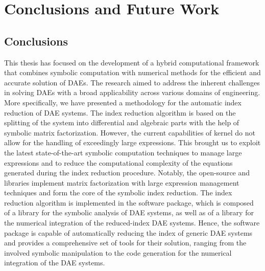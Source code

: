 
\chapter{Conclusions and Future Work}
\label{chap6:conclusions}

\section{Conclusions}

This thesis has focused on the development of a hybrid computational framework that combines symbolic computation with numerical methods for the efficient and accurate solution of \acp{DAE}. The research aimed to address the inherent challenges in solving \acp{DAE} with a broad applicability across various domains of engineering. More specifically, we have presented a methodology for the automatic index reduction of \ac{DAE} systems. The index reduction algorithm is based on the splitting of the system into differential and algebraic parts with the help of symbolic matrix factorization. However, the current capabilities of \Maple{} kernel do not allow for the handling of exceedingly large expressions. This brought us to exploit the latest state-of-the-art symbolic computation techniques to manage large expressions and to reduce the computational complexity of the equations generated during the index reduction procedure. Notably, the open-source \LEM{} and \LAST{} libraries implement matrix factorization with large expression management techniques and form the core of the symbolic index reduction. The index reduction algorithm is implemented in the \Indigo{} software package, which is composed of a \Maple{} library for the symbolic analysis of \ac{DAE} systems, as well as of a \Matlab{} library for the numerical integration of the reduced-index \ac{DAE} systems. Hence, the \Indigo{} software package is capable of automatically reducing the index of generic \ac{DAE} systems and provides a comprehensive set of tools for their solution, ranging from the involved symbolic manipulation to the \Matlab{} code generation for the numerical integration of the \ac{DAE} systems.

